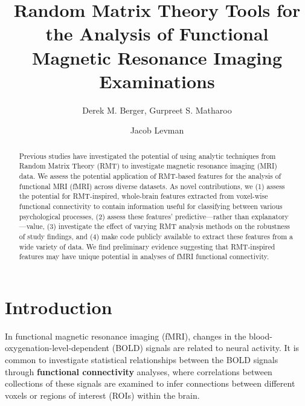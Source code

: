 \documentclass[NETN,manuscript]{stjour-new}
\begin{document}
\title{Random Matrix Theory Tools for the Analysis of Functional Magnetic Resonance Imaging Examinations}
\author[Derek M. Berger, Gurpreet S. Matharoo, Jacob Levman]{
    Derek M. Berger,
    Gurpreet S. Matharoo
    \and Jacob Levman
}



\begin{abstract}
    Previous studies have investigated the potential of using analytic techniques from Random Matrix
    Theory (RMT) to investigate magnetic resonance imaging (MRI) data. We assess the potential
    application of RMT-based features for the analysis of functional MRI (fMRI) across diverse
    datasets. As novel contributions, we (1) assess the potential for RMT-inspired, whole-brain
    features extracted from voxel-wise functional connectivity to contain information useful for
    classifying between various psychological processes, (2) assess these features’
    predictive—rather than explanatory—value, (3) investigate the effect of varying RMT analysis
    methods on the robustness of study findings, and (4) make code publicly available to extract
    these features from a wide variety of data. We find preliminary evidence suggesting that
    RMT-inspired features may have unique potential in analyses of fMRI functional connectivity.
\end{abstract}

\section{Introduction}

In functional magnetic resonance imaging (fMRI), changes in the blood-oxygenation-level-dependent
(BOLD) signals are related to neural activity. It is common to investigate statistical relationships
between the BOLD signals through \textbf{functional connectivity} analyses, where correlations between
collections of these signals are examined to infer connections between different voxels or regions
of interest (ROIs) within the brain.
\end{document}
